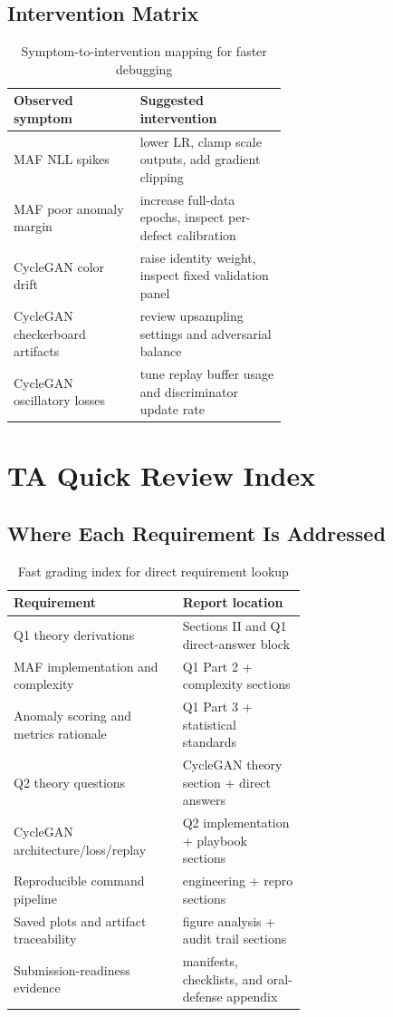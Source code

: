 \documentclass[conference]{IEEEtran}
\begin{document}
\subsection{Intervention Matrix}
\begin{table}[!t]
\centering
\small
\caption{Symptom-to-intervention mapping for faster debugging}
\begin{tabular}{|p{0.26\linewidth}|p{0.34\linewidth}|}
\hline
\textbf{Observed symptom} & \textbf{Suggested intervention} \\
\hline
MAF NLL spikes & lower LR, clamp scale outputs, add gradient clipping \\
\hline
MAF poor anomaly margin & increase full-data epochs, inspect per-defect calibration \\
\hline
CycleGAN color drift & raise identity weight, inspect fixed validation panel \\
\hline
CycleGAN checkerboard artifacts & review upsampling settings and adversarial balance \\
\hline
CycleGAN oscillatory losses & tune replay buffer usage and discriminator update rate \\
\hline
\end{tabular}
\end{table}

\section{TA Quick Review Index}
\subsection{Where Each Requirement Is Addressed}
\begin{table}[!t]
\centering
\small
\caption{Fast grading index for direct requirement lookup}
\begin{tabular}{|p{0.32\linewidth}|p{0.32\linewidth}|}
\hline
\textbf{Requirement} & \textbf{Report location} \\
\hline
Q1 theory derivations & Sections II and Q1 direct-answer block \\
\hline
MAF implementation and complexity & Q1 Part 2 + complexity sections \\
\hline
Anomaly scoring and metrics rationale & Q1 Part 3 + statistical standards \\
\hline
Q2 theory questions & CycleGAN theory section + direct answers \\
\hline
CycleGAN architecture/loss/replay & Q2 implementation + playbook sections \\
\hline
Reproducible command pipeline & engineering + repro sections \\
\hline
Saved plots and artifact traceability & figure analysis + audit trail sections \\
\hline
Submission-readiness evidence & manifests, checklists, and oral-defense appendix \\
\hline
\end{tabular}
\end{table}
\end{document}
